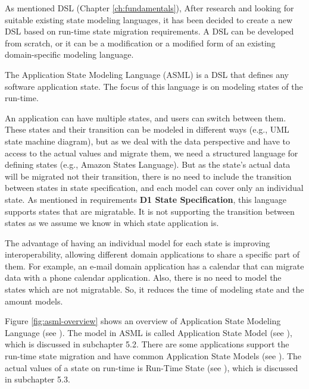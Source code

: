 As mentioned DSL (Chapter \ref{ch:fundamentals}), After research and looking for suitable existing state modeling languages, it has been decided to create a new DSL based on run-time state migration requirements.
A DSL can be developed from scratch, or it can be a modification or a modified form of an existing domain-specific modeling language.

The Application State Modeling Language (ASML) is a DSL that defines any software application state.
The focus of this language is on modeling states of the run-time.

An application can have multiple states, and users can switch between them.
These states and their transition can be modeled in different ways (e.g., UML state machine diagram), but as we deal with the data perspective and have to access to the actual values and migrate them, we need a structured language for defining states (e.g., Amazon States Language). But as the state’s actual data will be migrated not their transition, there is no need to include the transition between states in state specification, and each model can cover only an individual state. As mentioned in requirements \textbf{D1 State Specification}, this language supports states that are migratable.
It is not supporting the transition between states as we assume we know in which state application is. 

The advantage of having an individual model for each state is improving interoperability, allowing different domain applications to share a specific part of them.
For example, an e-mail domain application has a calendar that can migrate data with a phone calendar application.
Also, there is no need to model the states which are not migratable. So, it reduces the time of modeling state and the amount models. 

Figure \ref{fig:asml-overview} shows an overview of Application State Modeling Language (see \fcircone). The model in ASML is called Application State Model (see \fcirctwo), which is discussed in subchapter 5.2. There are some applications support the run-time state migration and have common Application State Models (see \fcircthree). The  actual values of a state on run-time is Run-Time State (see \fcircfour), which is discussed in subchapter 5.3.

